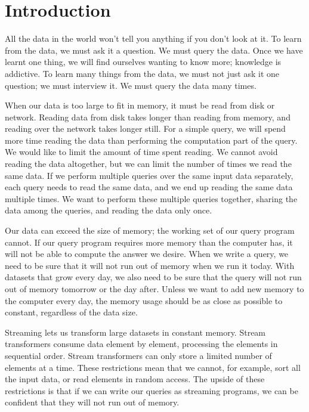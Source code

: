 \chapter{Introduction}
\label{chapter:introduction}

All the data in the world won't tell you anything if you don't look at it.
To learn from the data, we must ask it a question.
We must query the data.
Once we have learnt one thing, we will find ourselves wanting to know more; knowledge is addictive.
To learn many things from the data, we must not just ask it one question; we must interview it.
We must query the data many times.

When our data is too large to fit in memory, it must be read from disk or network.
Reading data from disk takes longer than reading from memory, and reading over the network takes longer still.
For a simple query, we will spend more time reading the data than performing the computation part of the query.
We would like to limit the amount of time spent reading.
We cannot avoid reading the data altogether, but we can limit the number of times we read the same data.
If we perform multiple queries over the same input data separately, each query needs to read the same data, and we end up reading the same data multiple times.
We want to perform these multiple queries together, sharing the data among the queries, and reading the data only once.

Our data can exceed the size of memory; the working set of our query program cannot.
If our query program requires more memory than the computer has, it will not be able to compute the answer we desire.
When we write a query, we need to be sure that it will not run out of memory when we run it today.
With datasets that grow every day, we also need to be sure that the query will not run out of memory tomorrow or the day after.
Unless we want to add new memory to the computer every day, the memory usage should be as close as possible to constant, regardless of the data size.

Streaming lets us transform large datasets in constant memory.
Stream transformers consume data element by element, processing the elements in sequential order.
Stream transformers can only store a limited number of elements at a time.
These restrictions mean that we cannot, for example, sort all the input data, or read elements in random access.
The upside of these restrictions is that if we can write our queries as streaming programs, we can be confident that they will not run out of memory.

